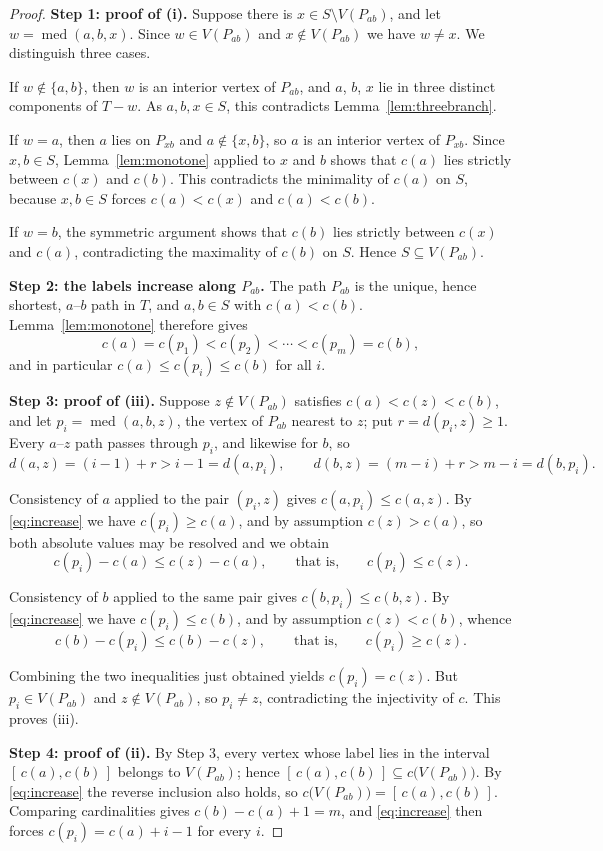 \documentclass[10pt,a4paper]{amsart}
\newcommand{\med}{\operatorname{med}}
\begin{document}
\begin{proof}
\textbf{Step 1: proof of (i).}
Suppose there is $x\in S\setminus V(P_{ab})$, and let $w=\med(a,b,x)$. Since
$w\in V(P_{ab})$ and $x\notin V(P_{ab})$ we have $w\ne x$. We distinguish
three cases.

If $w\notin\{a,b\}$, then $w$ is an interior vertex of $P_{ab}$, and $a$, $b$,
$x$ lie in three distinct components of $T-w$. As $a,b,x\in S$, this
contradicts Lemma~\ref{lem:threebranch}.

If $w=a$, then $a$ lies on $P_{xb}$ and $a\notin\{x,b\}$, so $a$ is an interior
vertex of $P_{xb}$. Since $x,b\in S$, Lemma~\ref{lem:monotone} applied to $x$
and $b$ shows that $c(a)$ lies strictly between $c(x)$ and $c(b)$. This
contradicts the minimality of $c(a)$ on $S$, because $x,b\in S$ forces
$c(a)<c(x)$ and $c(a)<c(b)$.

If $w=b$, the symmetric argument shows that $c(b)$ lies strictly between $c(x)$
and $c(a)$, contradicting the maximality of $c(b)$ on $S$. Hence
$S\subseteq V(P_{ab})$.

\medskip
\noindent\textbf{Step 2: the labels increase along $P_{ab}$.}
The path $P_{ab}$ is the unique, hence shortest, $a$--$b$ path in $T$, and
$a,b\in S$ with $c(a)<c(b)$. Lemma~\ref{lem:monotone} therefore gives
\begin{equation}
  c(a)=c(p_1)<c(p_2)<\cdots<c(p_m)=c(b),
  \label{eq:increase}
\end{equation}
and in particular $c(a)\le c(p_i)\le c(b)$ for all $i$.

\medskip
\noindent\textbf{Step 3: proof of (iii).}
Suppose $z\notin V(P_{ab})$ satisfies $c(a)<c(z)<c(b)$, and let
$p_i=\med(a,b,z)$, the vertex of $P_{ab}$ nearest to $z$; put
$r=d(p_i,z)\ge1$. Every $a$--$z$ path passes through $p_i$, and likewise for
$b$, so
\[
  d(a,z)=(i-1)+r>i-1=d(a,p_i),
  \qquad
  d(b,z)=(m-i)+r>m-i=d(b,p_i).
\]

Consistency of $a$ applied to the pair $(p_i,z)$ gives $c(a,p_i)\le c(a,z)$. By
\eqref{eq:increase} we have $c(p_i)\ge c(a)$, and by assumption $c(z)>c(a)$, so
both absolute values may be resolved and we obtain
\[
  c(p_i)-c(a)\le c(z)-c(a),
  \qquad\text{that is,}\qquad c(p_i)\le c(z).
\]

Consistency of $b$ applied to the same pair gives $c(b,p_i)\le c(b,z)$. By
\eqref{eq:increase} we have $c(p_i)\le c(b)$, and by assumption $c(z)<c(b)$,
whence
\[
  c(b)-c(p_i)\le c(b)-c(z),
  \qquad\text{that is,}\qquad c(p_i)\ge c(z).
\]

Combining the two inequalities just obtained yields $c(p_i)=c(z)$. But
$p_i\in V(P_{ab})$ and $z\notin V(P_{ab})$, so $p_i\ne z$, contradicting the
injectivity of $c$. This proves (iii).

\medskip
\noindent\textbf{Step 4: proof of (ii).}
By Step 3, every vertex whose label lies in the interval $[\,c(a),c(b)\,]$
belongs to $V(P_{ab})$; hence $[\,c(a),c(b)\,]\subseteq c\bigl(V(P_{ab})\bigr)$.
By \eqref{eq:increase} the reverse inclusion also holds, so
$c\bigl(V(P_{ab})\bigr)=[\,c(a),c(b)\,]$. Comparing cardinalities gives
$c(b)-c(a)+1=m$, and \eqref{eq:increase} then forces $c(p_i)=c(a)+i-1$ for
every $i$.
\end{proof}
\end{document}
